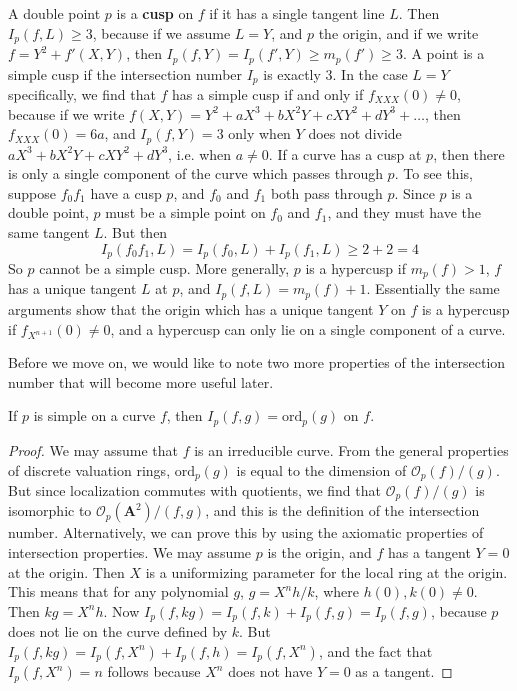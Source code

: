 \begin{example}
    A double point $p$ is a {\bf cusp} on $f$ if it has a single tangent line $L$. Then $I_p(f,L) \geq 3$, because if we assume $L = Y$, and $p$ the origin, and if we write $f = Y^2 + f'(X,Y)$, then $I_p(f,Y) = I_p(f',Y) \geq m_p(f') \geq 3$. A point is a simple cusp if the intersection number $I_p$ is exactly 3. In the case $L = Y$ specifically, we find that $f$ has a simple cusp if and only if $f_{XXX}(0) \neq 0$, because if we write $f(X,Y) = Y^2 + aX^3 + bX^2Y + cXY^2 + dY^3 + \dots$, then $f_{XXX}(0) = 6a$, and $I_p(f,Y) = 3$ only when $Y$ does not divide $aX^3 + bX^2Y + cXY^2 + dY^3$, i.e. when $a \neq 0$. If a curve has a cusp at $p$, then there is only a single component of the curve which passes through $p$. To see this, suppose $f_0f_1$ have a cusp $p$, and $f_0$ and $f_1$ both pass through $p$. Since $p$ is a double point, $p$ must be a simple point on $f_0$ and $f_1$, and they must have the same tangent $L$. But then
    \[ I_p(f_0f_1,L) = I_p(f_0,L) + I_p(f_1,L) \geq 2 + 2 = 4 \]
    So $p$ cannot be a simple cusp. More generally, $p$ is a hypercusp if $m_p(f) > 1$, $f$ has a unique tangent $L$ at $p$, and $I_p(f,L) = m_p(f) + 1$. Essentially the same arguments show that the origin which has a unique tangent $Y$ on $f$ is a hypercusp if $f_{X^{n+1}}(0) \neq 0$, and a hypercusp can only lie on a single component of a curve.
\end{example}

Before we move on, we would like to note two more properties of the intersection number that will become more useful later.

\begin{theorem}
    If $p$ is simple on a curve $f$, then $I_p(f,g) = \text{ord}_p(g)$ on $f$.
\end{theorem}
\begin{proof}
    We may assume that $f$ is an irreducible curve. From the general properties of discrete valuation rings, $\text{ord}_p(g)$ is equal to the dimension of $\mathcal{O}_p(f)/(g)$. But since localization commutes with quotients, we find that $\mathcal{O}_p(f)/(g)$ is isomorphic to $\mathcal{O}_p(\mathbf{A}^2)/(f,g)$, and this is the definition of the intersection number. Alternatively, we can prove this by using the axiomatic properties of intersection properties. We may assume $p$ is the origin, and $f$ has a tangent $Y = 0$ at the origin. Then $X$ is a uniformizing parameter for the local ring at the origin. This means that for any polynomial $g$, $g = X^nh/k$, where $h(0), k(0) \neq 0$. Then $kg = X^nh$. Now $I_p(f,kg) = I_p(f,k) + I_p(f,g) = I_p(f,g)$, because $p$ does not lie on the curve defined by $k$. But $I_p(f,kg) = I_p(f,X^n) + I_p(f,h) = I_p(f,X^n)$, and the fact that $I_p(f,X^n) = n$ follows because $X^n$ does not have $Y = 0$ as a tangent.
\end{proof}


